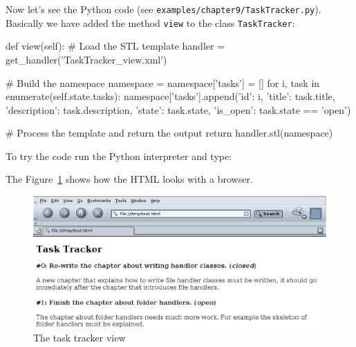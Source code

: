 Now let's see the Python code (see {\tt examples/chapter9/TaskTracker.py}).
Basically we have added the method {\tt view} to the class {\tt TaskTracker}:

\begin{code}
    def view(self):
        # Load the STL template
        handler = get_handler('TaskTracker_view.xml')

        # Build the namespace
        namespace = {}
        namespace['tasks'] = []
        for i, task in enumerate(self.state.tasks):
            namespace['tasks'].append({'id': i,
                                       'title': task.title,
                                       'description': task.description,
                                       'state': task.state,
                                       'is_open': task.state == 'open'})

        # Process the template and return the output
        return handler.stl(namespace)
\end{code}

To try the code run the Python interpreter and type:


The Figure~\ref{Figure: task tracker} shows how the HTML looks with a
browser.

\begin{figure}
  \center
  \includegraphics[width=\textwidth]{task_tracker.eps}
  \caption{The task tracker view}
  \label{Figure: task tracker}
\end{figure}

